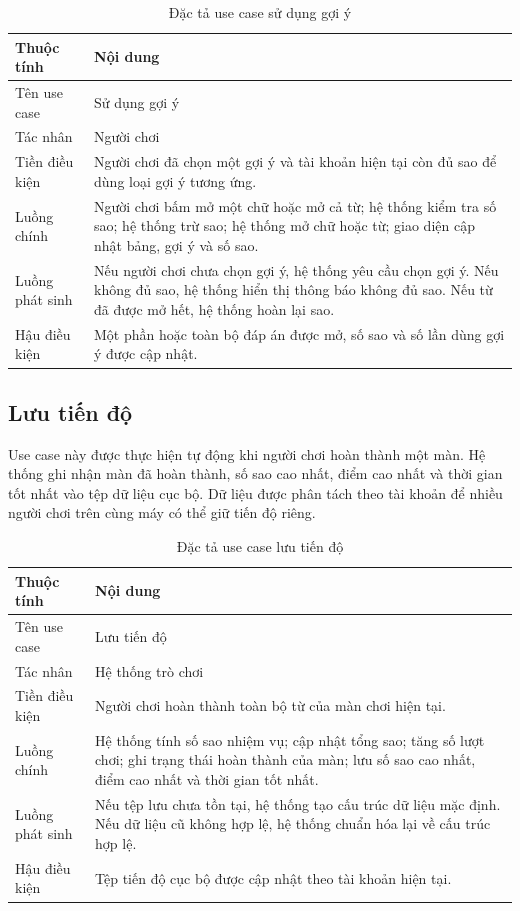 \documentclass[../DoAn.tex]{subfiles}
\begin{document}
\begin{table}[H]
\centering
\begin{tabularx}{\textwidth}{|>{\RaggedRight\arraybackslash}p{3.2cm}|>{\RaggedRight\arraybackslash}X|}
\hline
\textbf{Thuộc tính} & \textbf{Nội dung} \\ \hline
Tên use case & Sử dụng gợi ý \\ \hline
Tác nhân & Người chơi \\ \hline
Tiền điều kiện & Người chơi đã chọn một gợi ý và tài khoản hiện tại còn đủ sao để dùng loại gợi ý tương ứng. \\ \hline
Luồng chính & Người chơi bấm mở một chữ hoặc mở cả từ; hệ thống kiểm tra số sao; hệ thống trừ sao; hệ thống mở chữ hoặc từ; giao diện cập nhật bảng, gợi ý và số sao. \\ \hline
Luồng phát sinh & Nếu người chơi chưa chọn gợi ý, hệ thống yêu cầu chọn gợi ý. Nếu không đủ sao, hệ thống hiển thị thông báo không đủ sao. Nếu từ đã được mở hết, hệ thống hoàn lại sao. \\ \hline
Hậu điều kiện & Một phần hoặc toàn bộ đáp án được mở, số sao và số lần dùng gợi ý được cập nhật. \\ \hline
\end{tabularx}
\caption{Đặc tả use case sử dụng gợi ý}
\label{table:uc_hint}
\end{table}

\subsection{Lưu tiến độ}
Use case này được thực hiện tự động khi người chơi hoàn thành một màn. Hệ thống ghi nhận màn đã hoàn thành, số sao cao nhất, điểm cao nhất và thời gian tốt nhất vào tệp dữ liệu cục bộ. Dữ liệu được phân tách theo tài khoản để nhiều người chơi trên cùng máy có thể giữ tiến độ riêng.

\begin{table}[H]
\centering
\begin{tabularx}{\textwidth}{|>{\RaggedRight\arraybackslash}p{3.2cm}|>{\RaggedRight\arraybackslash}X|}
\hline
\textbf{Thuộc tính} & \textbf{Nội dung} \\ \hline
Tên use case & Lưu tiến độ \\ \hline
Tác nhân & Hệ thống trò chơi \\ \hline
Tiền điều kiện & Người chơi hoàn thành toàn bộ từ của màn chơi hiện tại. \\ \hline
Luồng chính & Hệ thống tính số sao nhiệm vụ; cập nhật tổng sao; tăng số lượt chơi; ghi trạng thái hoàn thành của màn; lưu số sao cao nhất, điểm cao nhất và thời gian tốt nhất. \\ \hline
Luồng phát sinh & Nếu tệp lưu chưa tồn tại, hệ thống tạo cấu trúc dữ liệu mặc định. Nếu dữ liệu cũ không hợp lệ, hệ thống chuẩn hóa lại về cấu trúc hợp lệ. \\ \hline
Hậu điều kiện & Tệp tiến độ cục bộ được cập nhật theo tài khoản hiện tại. \\ \hline
\end{tabularx}
\caption{Đặc tả use case lưu tiến độ}
\label{table:uc_save}
\end{table}
\end{document}
